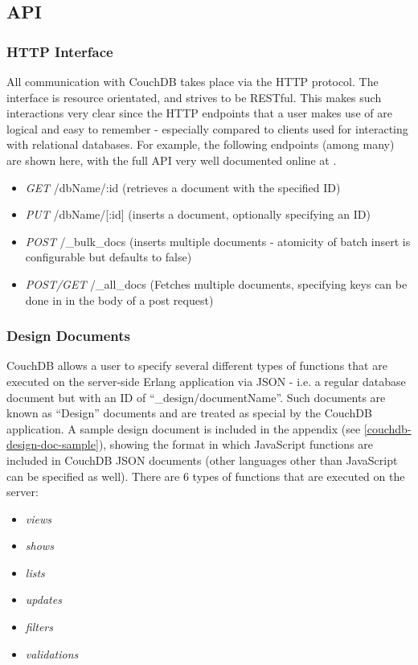 \subsection{API}
\subsubsection{HTTP Interface}
All communication with CouchDB takes place via the HTTP protocol. The interface is resource orientated, and strives to be RESTful. This makes such interactions very clear since the HTTP endpoints that a user makes use of are logical and easy to remember - especially compared to clients used for interacting with relational databases. For example, the following endpoints (among many) are shown here, with the full API very well documented online at \cite{couch-api}.

\begin{itemize}
    \item \textit{GET} /dbName/:id (retrieves a document with the specified ID)
    \item \textit{PUT} /dbName/[:id] (inserts a document, optionally specifying an ID)
    \item \textit{POST} /\_bulk\_docs (inserts multiple documents - atomicity of batch insert is configurable but defaults to false)
    \item \textit{POST/GET} /\_all\_docs (Fetches multiple documents, specifying keys can be done in in the body of a post request)
\end{itemize}

\subsubsection{Design Documents}
CouchDB allows a user to specify several different types of functions that are executed on the server-side Erlang application via JSON - i.e. a regular database document but with an ID of ``\_design/documentName''. Such documents are known as ``Design'' documents and are treated as special by the CouchDB application. A sample design document is included in the appendix (see \ref{couchdb-design-doc-sample}), showing the format in which JavaScript functions are included in CouchDB JSON documents (other languages other than JavaScript can be specified as well). There are 6 types of functions that are executed on the server:

\begin{itemize}
    \item \textit{views}
    \item \textit{shows}
    \item \textit{lists}
    \item \textit{updates}
    \item \textit{filters}
    \item \textit{validations}
\end{itemize}

